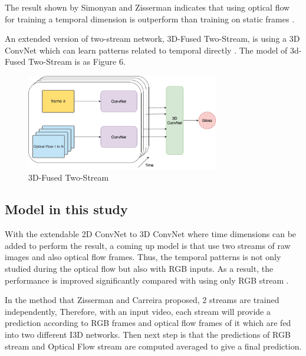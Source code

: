 \documentclass[a4paper, 12pt]{article}
\begin{document}
The result shown by Simonyan and Zisserman indicates that using optical flow for training a temporal dimension is outperform than training on static frames \citep{karpathy2014large}.

An extended version of two-stream network, 3D-Fused Two-Stream, is using a 3D ConvNet which can learn patterns related to temporal directly \citep{carreira2017quo}. The model of 3d-Fused Two-Stream is as Figure 6.

\begin{figure}[H]
    \centering
    \includegraphics[width=0.75\textwidth]{3D-Fused Two-stream.png}
    \caption{3D-Fused Two-Stream}
    \label{Figure 3D-Fused Two Stream}
\end{figure}

\subsection{Model in this study}
With the extendable 2D ConvNet to 3D ConvNet where time dimensions can be added to perform the result, a coming up model is that use two streams of raw images and also optical flow frames. Thus, the temporal patterns is not only studied during the optical flow but also with RGB inputs. As a result, the performance is improved significantly compared with using only RGB stream \citep{carreira2017quo}.

In the method that Zisserman and Carreira proposed, 2 streams are trained independently, Therefore, with an input video, each stream will provide a prediction according to RGB frames and optical flow frames of it which are fed into two different I3D networks. Then next step is that the predictions of RGB stream and Optical Flow stream are computed averaged to give a final prediction.
\end{document}
